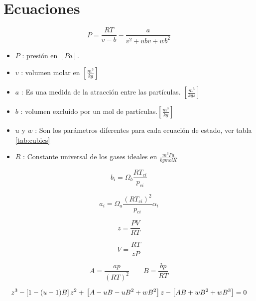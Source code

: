 \chapter{Ecuaciones}



\begin{equation}\label{eq:pressure}
P = \frac{R T}{v-b} - \frac{a}{v^2 +u b v + w b^2 }
\end{equation}


\begin{itemize}\itemsep0ex
\item $P$ : presión en $[Pa]$.
\item $v$ : volumen molar en $[\frac{m^3}{kg}]$
\item $a$ : Es una medida de la atracción entre las partículas. $[\frac{m^5}{kg s}]$
\item $b$ : volumen excluido por un mol de partículas.$[\frac{m^3}{kg}]$
\item $u$ y $w$ : Son los parámetros diferentes para cada ecuación de estado, ver tabla \ref{tab:cubics}
\item $R$ : Constante universal de los gases ideales en $\frac{m^3 Pa}{kgmol K}$
\end{itemize}


\begin{equation}\label{eq:a}
	b_i = \Omega_b \frac{R T_{ci}}{p_{ci}} 
\end{equation}

\begin{equation}\label{eq:b}
 a_i = \Omega_a \frac{\left(R T_{ci}\right)^2}{p_{ci}} \alpha_i
\end{equation}


\begin{equation}\label{eq:z}
z= \frac{P V}{R T}
\end{equation}

\begin{equation}\label{eq:volume}
V = \frac{R T}{z P}
\end{equation}

\begin{equation}\label{eq:AB}
A=\frac{ap}{(RT)^2}
\qquad
B=\frac{bp}{RT}
\end{equation}

\begin{equation}
z^3-\left[1-(u-1)B\right]z^2+ \\ \left[A-uB-uB^2 +\\ wB^2\right]z-\left[AB+wB^2+wB^3\right]=0
\end{equation}


